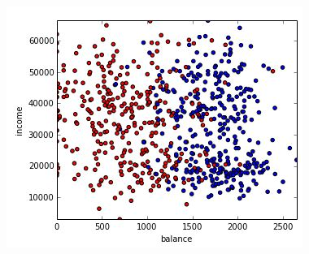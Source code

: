 \documentclass[MASTER.tex]{subfiles}
\begin{document}
\begin{frame}[fragile]
	
	\begin{figure}
\centering
\includegraphics[width=0.95\linewidth]{sklcass/sklclass3}

\end{figure}

	
\end{frame}
\end{document}
